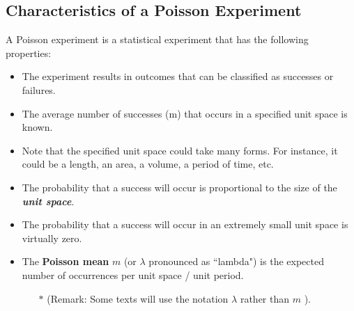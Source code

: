 \documentclass[a4paper,12pt]{article}
\begin{document}
\smallskip

\subsection*{Characteristics of a Poisson Experiment}
A Poisson experiment is a statistical experiment that has the following properties:
\begin{itemize}
	\item The experiment results in outcomes that can be classified as successes or failures.
	\item The average number of successes (m) that occurs in a specified unit space is known.
	\item Note that the specified unit space could take many forms. For instance, it could be a length, an area, a volume, a period of time, etc.
	\item  The probability that a success will occur is proportional to the size of the \textbf{\emph{unit space}}.
	\item The probability that a success will occur in an extremely small unit space is virtually zero.
	\item  The \textbf{Poisson mean} $m$ (or $\lambda$ pronounced as ``lambda") is the expected number of occurrences per unit space / unit period.
\begin{itemize}
\item[$\ast$] (Remark:  Some texts will use the notation $\lambda$ rather than  $m$ ).
\end{itemize}
\end{itemize}

%
%
%

%
%
%
\end{document}
